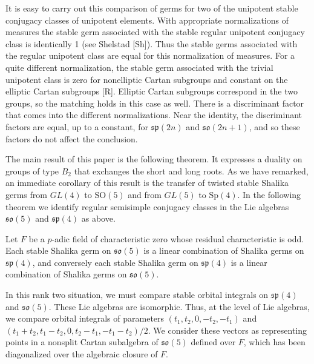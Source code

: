 \documentclass{amsart}
\newcommand\so{{\mathfrak s\mathfrak o}}
\newcommand\fsp{{\mathfrak s\mathfrak p}}
\newenvironment{cthm}[1]
  {\renewcommand\thethm{\sc #1}\thm}
  {\endthm}
\begin{document}
It is easy to carry out this comparison of germs
for two of the unipotent
stable conjugacy classes of unipotent elements.  With appropriate
normalizations of measures the stable germ associated with the stable
regular unipotent conjugacy class is identically 1  (see Shelstad [Sh]).
Thus the stable germs associated with the regular unipotent class
are equal for this normalization of measures.  For a quite
different normalization, the stable germ associated with 
the trivial unipotent class is zero for nonelliptic Cartan subgroups
and constant on the elliptic Cartan subgroups [R]. Elliptic Cartan subgroups
correspond in the two groups, so the matching holds in this case as
well.  There is a discriminant factor that comes into the different
normalizations.  Near the identity, 
the discriminant factors are
equal, up to a constant, for $\fsp(2n)$ and $\so(2n+1)$, and so these
factors do
not affect the conclusion.

The main result of this paper is the following theorem.  It expresses
a duality on groups of type $B_2$ that exchanges the short
and long roots.  As we have remarked, an immediate corollary of this
result is the transfer of twisted stable Shalika germs from $GL(4)$
to $\text{SO}(5)$ and from $GL(5)$ to $\text{Sp}(4)$.  In the following theorem
we identify regular semisimple conjugacy classes
in the Lie algebras $\so(5)$ and $\fsp(4)$
as above.

\bigskip
\noindent
\begin{cthm}{Theorem 1.1}   Let $F$ be a $p$-adic field of characteristic zero
whose residual characteristic is odd.  Each stable Shalika germ on $\so(5)$
is a linear combination of Shalika germs on $\fsp(4)$, and conversely each
stable Shalika germ on $\fsp(4)$ is a linear combination of Shalika germs
on $\so(5)$.
\end{cthm}

In this rank two situation,  we must compare stable orbital integrals
on $\fsp(4)$ and $\so(5)$. These Lie algebras are
isomorphic.  Thus, at the level of Lie algebras, we compare
orbital integrals of parameters $(t_1,t_2,0,-t_2,-t_1)$ and
$(t_1+t_2,t_1-t_2,0,t_2-t_1,-t_1-t_2)/2$.  We consider these vectors
as representing points in a nonsplit Cartan
subalgebra of $\so(5)$ defined over $F$, which has been
diagonalized over the algebraic closure of $F$.
\end{document}
